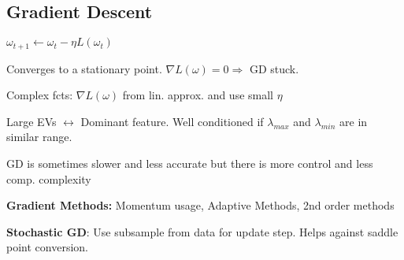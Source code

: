 \subsection{Gradient Descent}

$\omega_{t+1} \leftarrow \omega_t - \eta L(\omega_t)$

Converges to a stationary point. $\nabla L(\omega) = 0 \Rightarrow$ GD stuck.

Complex fcts: $\nabla L(\omega)$ from lin. approx. and use small $\eta$

Large EVs $\leftrightarrow$ Dominant feature. Well conditioned if $\lambda_{max}$ and $\lambda_{min}$ are in similar range.

GD is sometimes slower and less accurate but there is more control and less comp. complexity

\textbf{Gradient Methods:} Momentum usage, Adaptive Methods, 2nd order methods

\textbf{Stochastic GD}: Use subsample from data for update step. Helps against saddle point conversion.


